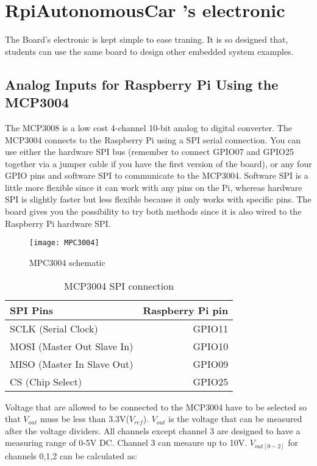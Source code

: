\documentclass[
12pt, %
a4paper, %
oneside, %
headinclude,footinclude, %
BCOR5mm, %
]{scrartcl}
\begin{document}
\section{RpiAutonomousCar 's electronic}
The Board's electronic is kept simple to ease traning. It is so designed that, students can use the same board to design other embedded system examples.
\subsection{Analog Inputs for Raspberry Pi Using the MCP3004}
The MCP3008 is a low cost 4-channel 10-bit analog to digital converter. The MCP3004 connects to the Raspberry Pi using a SPI serial connection. You can use either the hardware SPI bus (remember to connect GPIO07 and GPIO25 together via a jumper cable if you have the first version of the board), or any four GPIO pins and software SPI to communicate to the MCP3004. Software SPI is a little more flexible since it can work with any pins on the Pi, whereas hardware SPI is slightly faster but less flexible because it only works with specific pins. The board gives you the possibility to try both methods since it is also wired to the Raspberry Pi hardware SPI.

\begin{figure}[!htb]
\centering
\texttt{[image: MPC3004]} 
\caption[MPC3004 schematic]{MPC3004 schematic}
\label{fig:MPC3004}
\end{figure}

\begin{table}[hbt]
\caption{MCP3004 SPI connection}
\centering
\begin{tabular}{lr}
\toprule
SPI Pins & Raspberry Pi pin \\
\midrule
SCLK (Serial Clock)        & GPIO11 \\
MOSI (Master Out Slave In) & GPIO10 \\
MISO (Master In Slave Out) & GPIO09 \\
CS   (Chip Select)         & GPIO25 \\
\bottomrule
\end{tabular}
\label{tab:label}
\end{table}
Voltage that are allowed to be connected to the MCP3004 have to be selected so that \(V_{out}\) muss be less than 3.3V(\(V_{ref}\)). \(V_{out}\) is the voltage that can be measured after the voltage dividers. All channels except channel 3 are designed to have a measuring range of 0-5V DC. Channel 3 can mesaure up to 10V.
\(V_{out[0-2]}\) for channels 0,1,2 can be calculated as:
\end{document}
